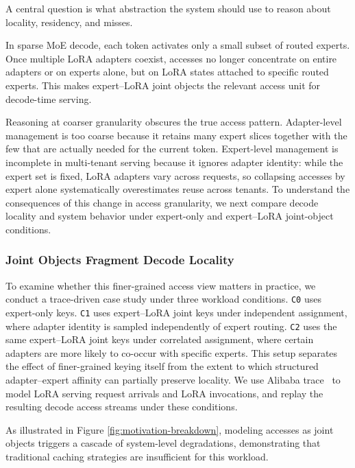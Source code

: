 \documentclass[sigplan,anonymous,review,nonacm]{acmart}
\begin{document}
A central question is what abstraction the system should use to reason about locality, residency, and misses.

In sparse MoE decode, each token activates only a small subset of routed experts. Once multiple LoRA adapters coexist, accesses no longer concentrate on entire adapters or on experts alone, but on LoRA states attached to specific routed experts. This makes expert--LoRA joint objects the relevant access unit for decode-time serving.

Reasoning at coarser granularity obscures the true access pattern. Adapter-level management is too coarse because it retains many expert slices together with the few that are actually needed for the current token. Expert-level management is incomplete in multi-tenant serving because it ignores adapter identity: while the expert set is fixed, LoRA adapters vary across requests, so collapsing accesses by expert alone systematically overestimates reuse across tenants. To understand the consequences of this change in access granularity, we next compare decode locality and system behavior under expert-only and expert--LoRA joint-object conditions.


\subsubsection{Joint Objects Fragment Decode Locality}
\label{subsec:case-study}

To examine whether this finer-grained access view matters in practice, we conduct a trace-driven case study under three workload conditions.
\texttt{C0} uses expert-only keys.
\texttt{C1} uses expert--LoRA joint keys under independent assignment, where adapter identity is sampled independently of expert routing.
\texttt{C2} uses the same expert--LoRA joint keys under correlated assignment, where certain adapters are more likely to co-occur with specific experts.
This setup separates the effect of finer-grained keying itself from the extent to which structured adapter--expert affinity can partially preserve locality.
We use Alibaba trace~\cite{lin2025understanding} to model LoRA serving request arrivals and LoRA invocations, and replay the resulting decode access streams under these conditions.

As illustrated in Figure \ref{fig:motivation-breakdown}, modeling accesses as joint objects triggers a cascade of system-level degradations, demonstrating that traditional caching strategies are insufficient for this workload.
\end{document}
